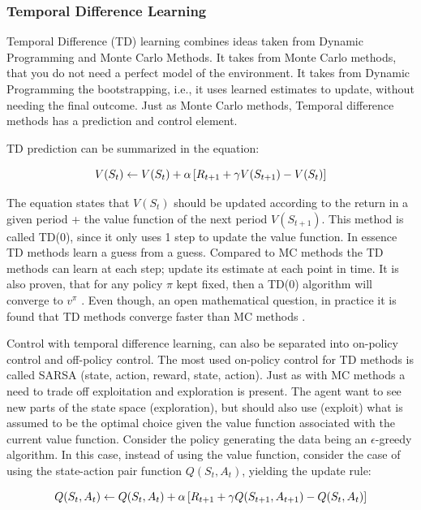 \subsubsection{Temporal Difference Learning}

Temporal Difference (TD) learning combines ideas taken from Dynamic Programming and Monte Carlo Methods. It takes from Monte Carlo methods, that you do not need a perfect model of the environment. It takes from Dynamic Programming the bootstrapping, i.e., it uses learned estimates to update, without needing the final outcome. Just as Monte Carlo methods, Temporal difference methods has a prediction and control element.

TD prediction can be summarized in the equation:

\begin{equation}
    V(S_t) \leftarrow V(S_t) + \alpha \left[ R_{t+1} + \gamma V(S_{t+1}) - V(S_t) \right]
\end{equation}

The equation states that $V(S_t)$ should be updated according to the return in a given period + the value function of the next period $V(S_{t+1})$. This method is called TD(0), since it only uses 1 step to update the value function. In essence TD methods learn a guess from a guess. Compared to MC methods the TD methods can learn at each step; update its estimate at each point in time. It is also proven, that for any policy $\pi$ kept fixed, then a TD(0) algorithm will converge to $v^{\pi}$ \parencite{sutton_reinforcement_2018}. Even though, an open mathematical question, in practice it is found that TD methods converge faster than MC methods \parencite{sutton_reinforcement_2018}.

Control with temporal difference learning, can also be separated into on-policy control and off-policy control. The most used on-policy control for TD methods is called SARSA (state, action, reward, state, action). Just as with MC methods a need to trade off exploitation and exploration is present. The agent want to see new parts of the state space (exploration), but should also use (exploit) what is assumed to be the optimal choice given the value function associated with the current value function. Consider the policy generating the data being an $\epsilon$-greedy algorithm. In this case, instead of using the value function, consider the case of using the state-action pair function $Q(S_t, A_t)$, yielding the update rule:

\begin{equation}
    Q(S_t, A_t) \leftarrow Q(S_t, A_t) + \alpha \left[ R_{t+1} + \gamma Q(S_{t+1}, A_{t+1}) - Q(S_t, A_t) \right]
\end{equation}

